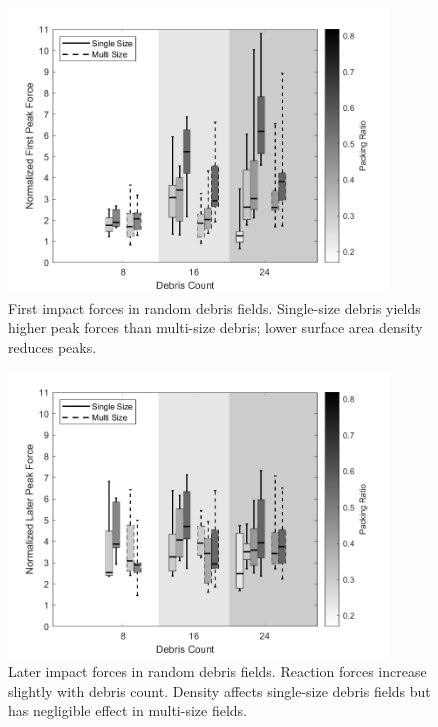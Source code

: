 \documentclass{article}
\begin{document}
\begin{figure}[htbp]
    \centering
    \includegraphics[width=0.9\textwidth]{First_Peak_Random_Single_vs_Multi_ByDensityGradient.png}
    \caption{First impact forces in random debris fields. Single-size debris yields higher peak forces than multi-size debris; lower surface area density reduces peaks.}
    \label{fig:random_peaks_first}
\end{figure}

\begin{figure}[htbp]
    \centering
    \includegraphics[width=0.9\textwidth]{Later_Peak_Random_Single_vs_Multi_ByDensityGradient.png}
    \caption{Later impact forces in random debris fields. Reaction forces increase slightly with debris count. Density affects single-size debris fields but has negligible effect in multi-size fields.}
    \label{fig:random_peaks_later}
\end{figure}
\end{document}
